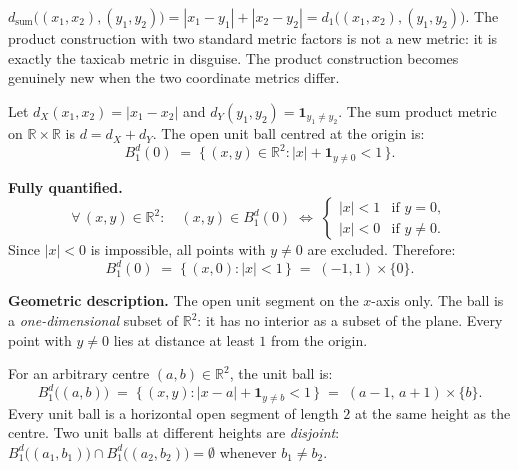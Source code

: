 \begin{remark*}
$d_{\mathrm{sum}}\bigl((x_1,x_2),(y_1,y_2)\bigr)
= |x_1-y_1| + |x_2-y_2| = d_1\bigl((x_1,x_2),(y_1,y_2)\bigr)$.
The product construction with two standard metric factors is not a
new metric: it is exactly the taxicab metric in disguise.
The product construction becomes genuinely new when the two coordinate
metrics differ.
\end{remark*}


\begin{tcolorbox}[colback=propbox, colframe=propborder, arc=2pt,
  left=6pt, right=6pt, top=4pt, bottom=4pt,
  title={\small\textbf{Unit Ball: Product Metric (Standard $\times$ Discrete)}},
  fonttitle=\small\bfseries]
\begin{definition}
\label{def:ball-std-disc}
Let $d_X(x_1,x_2) = |x_1-x_2|$ and
$d_Y(y_1,y_2) = \mathbf{1}_{y_1\neq y_2}$.
The sum product metric on $\mathbb{R}\times\mathbb{R}$ is
$d = d_X + d_Y$.
The open unit ball centred at the origin is:
\[
B_1^{d}(0)
\;=\; \bigl\{\,(x,y)\in\mathbb{R}^2 :
|x| + \mathbf{1}_{y\neq 0} < 1\,\bigr\}.
\]

\medskip
\noindent\textbf{Fully quantified.}
\[
\forall\,(x,y)\in\mathbb{R}^2:\quad
(x,y)\in B_1^{d}(0)
\;\iff\;
\begin{cases}
|x| < 1 & \text{if } y = 0, \\
|x| < 0 & \text{if } y \neq 0.
\end{cases}
\]
Since $|x| < 0$ is impossible, all points with $y \neq 0$ are excluded.
Therefore:
\[
B_1^{d}(0) \;=\; \bigl\{\,(x,0) : |x| < 1\,\bigr\}
\;=\; (-1,1) \times \{0\}.
\]

\medskip
\noindent\textbf{Geometric description.}
The open unit segment on the $x$-axis only.
The ball is a \emph{one-dimensional} subset of $\mathbb{R}^2$:
it has no interior as a subset of the plane.
Every point with $y \neq 0$ lies at distance at least $1$ from the origin.
\end{definition}
\end{tcolorbox}

\begin{remark*}
For an arbitrary centre $(a, b) \in \mathbb{R}^2$, the unit ball is:
\[
B_1^{d}\bigl((a,b)\bigr)
\;=\; \bigl\{\,(x,y) : |x-a| + \mathbf{1}_{y\neq b} < 1\,\bigr\}
\;=\; (a-1,\,a+1) \times \{b\}.
\]
Every unit ball is a horizontal open segment of length $2$ at the same
height as the centre.
Two unit balls at different heights are \emph{disjoint}:
$B_1^d\bigl((a_1, b_1)\bigr) \cap B_1^d\bigl((a_2, b_2)\bigr) = \emptyset$
whenever $b_1 \neq b_2$.
\end{remark*}


